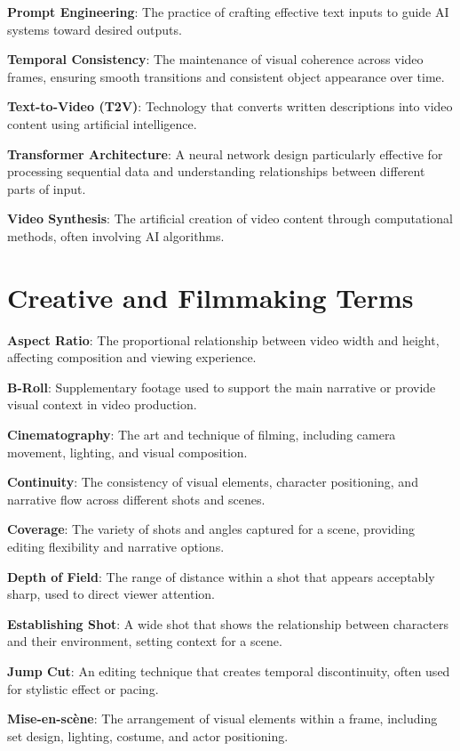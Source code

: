 \textbf{Prompt Engineering}: The practice of crafting effective text inputs to guide AI systems toward desired outputs.

\textbf{Temporal Consistency}: The maintenance of visual coherence across video frames, ensuring smooth transitions and consistent object appearance over time.

\textbf{Text-to-Video (T2V)}: Technology that converts written descriptions into video content using artificial intelligence.

\textbf{Transformer Architecture}: A neural network design particularly effective for processing sequential data and understanding relationships between different parts of input.

\textbf{Video Synthesis}: The artificial creation of video content through computational methods, often involving AI algorithms.

\section{Creative and Filmmaking Terms}

\textbf{Aspect Ratio}: The proportional relationship between video width and height, affecting composition and viewing experience.

\textbf{B-Roll}: Supplementary footage used to support the main narrative or provide visual context in video production.

\textbf{Cinematography}: The art and technique of filming, including camera movement, lighting, and visual composition.

\textbf{Continuity}: The consistency of visual elements, character positioning, and narrative flow across different shots and scenes.

\textbf{Coverage}: The variety of shots and angles captured for a scene, providing editing flexibility and narrative options.

\textbf{Depth of Field}: The range of distance within a shot that appears acceptably sharp, used to direct viewer attention.

\textbf{Establishing Shot}: A wide shot that shows the relationship between characters and their environment, setting context for a scene.

\textbf{Jump Cut}: An editing technique that creates temporal discontinuity, often used for stylistic effect or pacing.

\textbf{Mise-en-scène}: The arrangement of visual elements within a frame, including set design, lighting, costume, and actor positioning.

